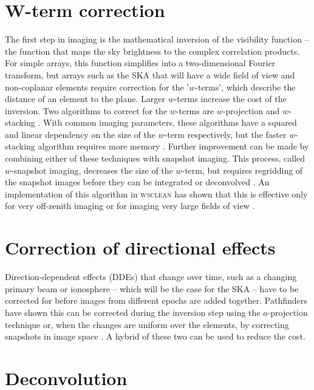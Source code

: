 \documentclass[9pt,conference,a4paper]{IEEEtran}
\begin{document}
\section{W-term correction}
The first step in imaging is the mathematical inversion of the visibility function -- the function that maps the sky brightness to the complex correlation products. For simple arrays, this function simplifies into a two-dimensional Fourier transform, but arrays such as the SKA that will have a wide field of view and non-coplanar elements require correction for the '$w$-terms', which describe the distance of an element to the plane. Larger $w$-terms increase the cost of the inversion. Two algorithms to correct for the $w$-terms are $w$-projection \cite{wprojection-cornwell} and $w$-stacking \cite{ska-memo-regridding-2011}. With common imaging parameters, these algorithms have a squared and linear dependency on the size of the $w$-term respectively, but the faster $w$-stacking algorithm requires more memory \cite{offringa-wsclean-2014}. Further improvement can be made by combining either of these techniques with snapshot imaging. This process, called $w$-snapshot imaging, decreases the size of the $w$-term, but requires regridding of the snapshot images before they can be integrated or deconvolved \cite{widefield-imaging-ska-cornwell}. An implementation of this algorithm in \textsc{wsclean} has shown that this is effective only for very off-zenith imaging or for imaging very large fields of view \cite{offringa-wsclean-2014}.

\section{Correction of directional effects}
Direction-dependent effects (DDEs) that change over time, such as a changing primary beam or ionosphere -- which will be the case for the SKA -- have to be corrected for before images from different epochs are added together. Pathfinders have shown this can be corrected during the inversion step using the $a$-projection technique \cite{awimager-2013,aprojection-2008} or, when the changes are uniform over the elements, by correcting snapshots in image space \cite{offringa-wsclean-2014,mwa-interferometric-imaging}. A hybrid of these two can be used to reduce the cost.

\section{Deconvolution}
\end{document}
